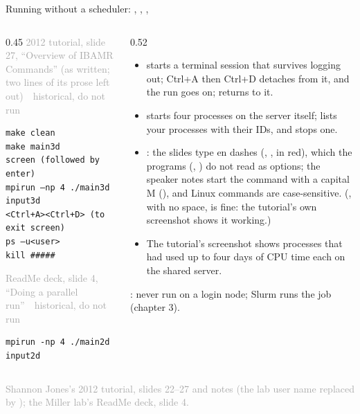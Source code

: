 \documentclass[aspectratio=169,11pt]{beamer}
\newcommand{\sourcecredit}[1]{\vfill\begin{flushright}\tiny\textcolor{DarkGray}{#1}\end{flushright}}
\newcommand{\ndashmark}{\textcolor{RubineRed}{\rmfamily\textendash}}
\newcommand{\hist}[1]{{\tiny\sffamily\textcolor{DarkGray}{#1\ \textbullet\ historical, do not run}}\par\nointerlineskip\vspace{0.3mm}}
\begin{document}
\begin{frame}[fragile]{Running without a scheduler: , , , }
\label{fr:noscheduler}
\begin{columns}[T,onlytextwidth]
\begin{column}{0.45\textwidth}
\hist{2012 tutorial, slide 27, ``Overview of IBAMR Commands'' (as written; two lines of its prose left out)}
\begin{lstlisting}[style=hist]
make clean
make main3d
screen (followed by enter)
mpirun –np 4 ./main3d input3d
<Ctrl+A><Ctrl+D> (to exit screen)
ps –u<user>
kill #####
\end{lstlisting}
\hist{ReadMe deck, slide 4, ``Doing a parallel run''}
\begin{lstlisting}[style=hist]
mpirun -np 4 ./main2d input2d
\end{lstlisting}
\end{column}
\begin{column}{0.52\textwidth}
\footnotesize
\begin{itemize}\setlength{\itemsep}{0.5pt}
  \item {} starts a terminal session that survives logging out; Ctrl+A then Ctrl+D detaches from it, and the run goes on;  returns to it.
  \item {} starts four processes on the server itself;  lists your processes with their IDs, and  stops one.
  \item {}: the slides type en dashes (\code{\ndashmark{}np}, \code{\ndashmark{}u}, in red), which the programs (, ) do not read as options; the speaker notes start the command with a capital M (), and Linux commands are case-sensitive. (, with no space, is fine: the tutorial's own screenshot shows it working.)
  \item The tutorial's  screenshot shows  processes that had used up to four days of CPU time each on the shared server.
\end{itemize}
\vspace{0.5mm}
: never run on a login node; Slurm runs the job (chapter 3).
\end{column}
\end{columns}
\sourcecredit{Shannon Jones's 2012 tutorial, slides 22--27 and notes (the lab user name replaced by \code{<user>}); the Miller lab's ReadMe deck, slide 4.}
\end{frame}
\end{document}
